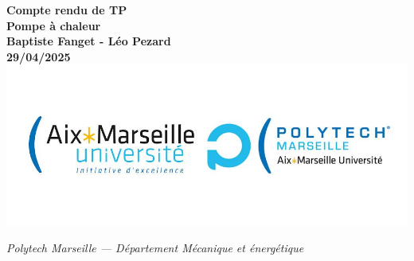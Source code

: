 \vfill

\begin{center}
{\LARGE \textbf{Compte rendu de TP \\ Pompe à chaleur}} \\[1em]
\textbf{Baptiste Fanget - Léo Pezard \\
29/04/2025} \\[2em]

\includegraphics[width=1\textwidth]{logo.jpg} \\[2em]
\end{center}

\vspace*{\fill} %

\begin{center}
\textit{Polytech Marseille — Département Mécanique et énergétique}
\end{center}

\newpage
